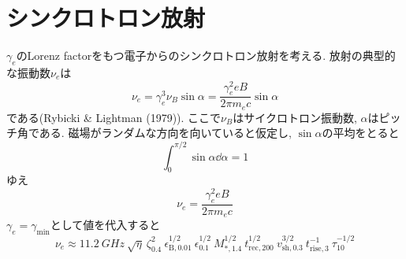 \documentclass{ltjsarticle}
\newcommand{\fMx}{M_{*,\num{1.4}}}
\newcommand{\fepsB}{\epsilon_{\mathrm{B},\num{0.01}}}
\newcommand{\feps}{\epsilon_{\num{0.1}}}
\newcommand{\ftrec}{t_{\mathrm{rec},\num{200}}}
\newcommand{\ftrise}{t_{\mathrm{rise},\num{3}}}
\newcommand{\ftdecay}{\tau_{\num{10}}}
\newcommand{\fvsh}{v_{\mathrm{sh},\num{0.3}}}
\newcommand{\fzeta}{\zeta_{\num{0.4}}}
\begin{document}
\section{シンクロトロン放射}
$\gamma_e$のLorenz factorをもつ電子からのシンクロトロン放射を考える.
放射の典型的な振動数$\nu_e$は
\begin{equation}
  \nu_e
  = \gamma_e^3\nu_B\sin\alpha
  = \frac{\gamma_e^2eB}{2\pi m_e c} \sin\alpha
\end{equation}
である(Rybicki \& Lightman (1979)).
ここで$\nu_B$はサイクロトロン振動数, $\alpha$はピッチ角である.
磁場がランダムな方向を向いていると仮定し, $\sin\alpha$の平均をとると
\begin{equation}
  \int_0^{\pi/2} \sin\alpha \dd{\alpha} = 1
\end{equation}
ゆえ
\begin{equation}
  \nu_e = \frac{\gamma_e^2eB}{2\pi m_e c}
\end{equation}
\( \gamma_e = \gamma_\mathrm{min} \)として値を代入すると
\begin{equation}
  \nu_e
  \approx
  \SI{11.2}{GHz}~
  \sqrt{\eta}~
  \fzeta^2~\fepsB^{1/2}~\feps^{1/2}~\fMx^{1/2}~
  \ftrec^{1/2}~\fvsh^{3/2}~\ftrise^{-1}~\ftdecay^{-1/2}
\end{equation}
\end{document}

